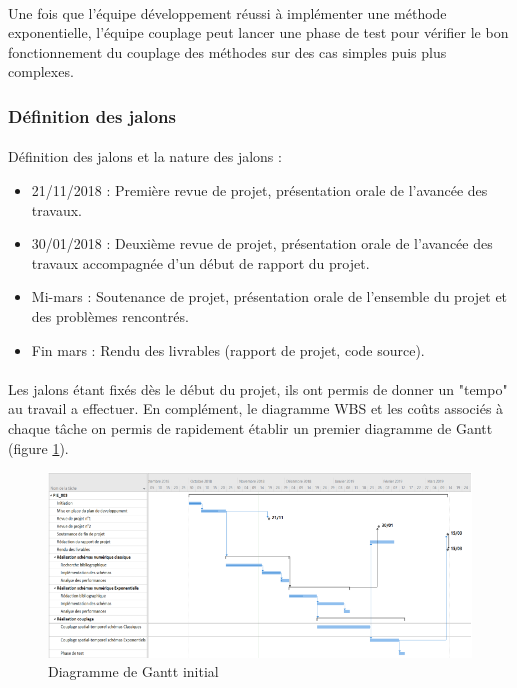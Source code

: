         \paragraph{}
        Une fois que l'équipe développement réussi à implémenter une méthode exponentielle, l'équipe couplage peut lancer une phase de test pour vérifier le bon fonctionnement du couplage des méthodes sur des cas simples puis plus complexes.

    \subsubsection{Définition des jalons}
        \paragraph{}
        Définition des jalons et la nature des jalons :
        \begin{itemize}
            \item 21/11/2018 : Première revue de projet, présentation orale de l'avancée des travaux.
            \item 30/01/2018 : Deuxième revue de projet, présentation orale de l'avancée des travaux accompagnée d'un début de rapport du projet.
            \item Mi-mars : Soutenance de projet, présentation orale de l'ensemble du projet et des problèmes rencontrés.
            \item Fin mars : Rendu des livrables (rapport de projet, code source).
        \end{itemize}
        \paragraph{}
        Les jalons étant fixés dès le début du projet, ils ont permis de donner un "tempo" au travail a effectuer. En complément, le diagramme WBS et les coûts associés à chaque tâche on permis de rapidement établir un premier diagramme de Gantt (figure \ref{fig:Gantt_initial}).
        \begin{figure}
            \centering
            \includegraphics[width=\textwidth]{images/gantt.png}
            \caption{Diagramme de Gantt initial} 
            \label{fig:Gantt_initial}
        \end{figure}

